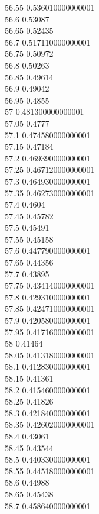 {56.55	0.536010000000001\\
56.6	0.53087\\
56.65	0.52435\\
56.7	0.517110000000001\\
56.75	0.50972\\
56.8	0.50263\\
56.85	0.49614\\
56.9	0.49042\\
56.95	0.4855\\
57	0.481300000000001\\
57.05	0.4777\\
57.1	0.474580000000001\\
57.15	0.47184\\
57.2	0.469390000000001\\
57.25	0.467120000000001\\
57.3	0.464930000000001\\
57.35	0.462730000000001\\
57.4	0.4604\\
57.45	0.45782\\
57.5	0.45491\\
57.55	0.45158\\
57.6	0.447790000000001\\
57.65	0.44356\\
57.7	0.43895\\
57.75	0.434140000000001\\
57.8	0.429310000000001\\
57.85	0.424710000000001\\
57.9	0.420580000000001\\
57.95	0.417160000000001\\
58	0.41464\\
58.05	0.413180000000001\\
58.1	0.412830000000001\\
58.15	0.41361\\
58.2	0.415460000000001\\
58.25	0.41826\\
58.3	0.421840000000001\\
58.35	0.426020000000001\\
58.4	0.43061\\
58.45	0.43544\\
58.5	0.440330000000001\\
58.55	0.445180000000001\\
58.6	0.44988\\
58.65	0.45438\\
58.7	0.458640000000001\\
}
